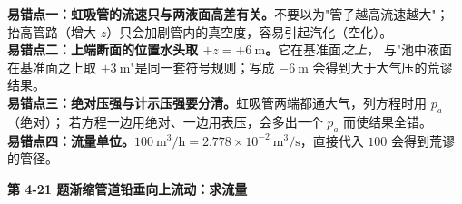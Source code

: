 \begin{yicuo}
\textbf{易错点一：虹吸管的流速只与两液面高差有关。}不要以为"管子越高流速越大"；
抬高管路（增大 $z$）只会加剧管内的真空度，容易引起汽化（空化）。\\
\textbf{易错点二：上端断面的位置水头取 $+z=+6\ \mathrm{m}$。}它在基准面\emph{之上}，
与"池中液面在基准面之上取 $+3\ \mathrm{m}$"是同一套符号规则；写成 $-6\ \mathrm{m}$ 会得到大于大气压的荒谬结果。\\
\textbf{易错点三：绝对压强与计示压强要分清。}虹吸管两端都通大气，列方程时用 $p_a$（绝对）；
若方程一边用绝对、一边用表压，会多出一个 $p_a$ 而使结果全错。\\
\textbf{易错点四：流量单位。}$100\ \mathrm{m^3/h}=2.778\times10^{-2}\ \mathrm{m^3/s}$，直接代入 $100$ 会得到荒谬的管径。
\end{yicuo}

\noindent\textbf{第 4-21 题\quad 渐缩管道铅垂向上流动：求流量}


